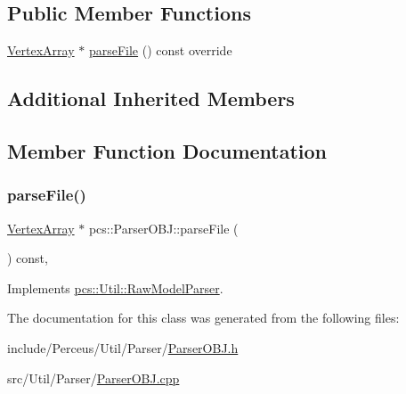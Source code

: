 \subsection*{Public Member Functions}
\begin{DoxyCompactItemize}
\item 
\hyperlink{classpcs_1_1VertexArray}{Vertex\+Array} $\ast$ \hyperlink{classpcs_1_1ParserOBJ_a9f83ac259feacf8ab83bfd73dc3ebb62}{parse\+File} () const override
\end{DoxyCompactItemize}
\subsection*{Additional Inherited Members}


\subsection{Member Function Documentation}
\mbox{\label{classpcs_1_1ParserOBJ_a9f83ac259feacf8ab83bfd73dc3ebb62}} 
\subsubsection{\texorpdfstring{parse\+File()}{parseFile()}}
{\footnotesize\ttfamily \hyperlink{classpcs_1_1VertexArray}{Vertex\+Array} $\ast$ pcs\+::\+Parser\+O\+B\+J\+::parse\+File (\begin{DoxyParamCaption}{ }\end{DoxyParamCaption}) const\hspace{0.3cm}{\ttfamily [override]}, {\ttfamily [virtual]}}



Implements \hyperlink{classpcs_1_1Util_1_1RawModelParser_a8f14c3221db14dc46ef6c8858690e106}{pcs\+::\+Util\+::\+Raw\+Model\+Parser}.



The documentation for this class was generated from the following files\+:\begin{DoxyCompactItemize}
\item 
include/\+Perceus/\+Util/\+Parser/\hyperlink{ParserOBJ_8h}{Parser\+O\+B\+J.\+h}\item 
src/\+Util/\+Parser/\hyperlink{ParserOBJ_8cpp}{Parser\+O\+B\+J.\+cpp}\end{DoxyCompactItemize}
